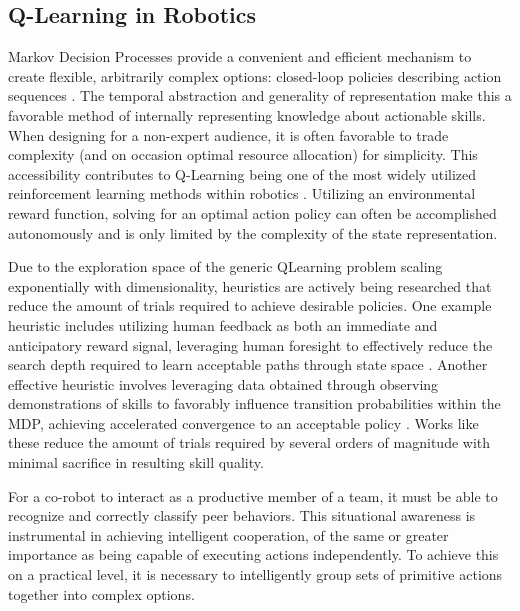 \documentclass[letterpaper]{article}
\begin{document}
\subsection{Q-Learning in Robotics}
Markov Decision Processes provide a convenient and efficient mechanism to create flexible, arbitrarily complex options: closed-loop policies describing action sequences \cite{SuttonMDP}. The temporal abstraction and generality of representation make this a favorable method of internally representing knowledge about actionable skills. When designing for a non-expert audience, it is often favorable to trade complexity (and on occasion optimal resource allocation) for simplicity. This accessibility contributes to Q-Learning being one of the most widely utilized reinforcement learning methods within robotics \cite{QLearningWatkins}. Utilizing an environmental reward function, solving for an optimal action policy can often be accomplished autonomously and is only limited by the complexity of the state representation.

Due to the exploration space of the generic QLearning problem scaling exponentially with dimensionality, heuristics are actively being researched that reduce the amount of trials required to achieve desirable policies. One example heuristic includes utilizing human feedback as both an immediate and anticipatory reward signal, leveraging human foresight to effectively reduce the search depth required to learn acceptable paths through state space \cite{TAMER}. Another effective heuristic involves leveraging data obtained through observing demonstrations of skills to favorably influence transition probabilities within the MDP, achieving accelerated convergence to an acceptable policy \cite{LFDSurvey}. Works like these reduce the amount of trials required by several orders of magnitude with minimal sacrifice in resulting skill quality.

For a co-robot to interact as a productive member of a team, it must be able to recognize and correctly classify peer behaviors. This situational awareness is instrumental in achieving intelligent cooperation, of the same or greater importance as being capable of executing actions independently. To achieve this on a practical level, it is necessary to intelligently group sets of primitive actions together into complex options. 
\end{document}
